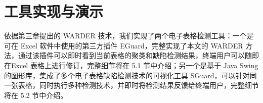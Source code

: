 \chapter{工具实现与演示}

依据第三章提出的 WARDER 技术，我们实现了两个电子表格检测工具：一个是可在 Excel 软件中使用的第三方插件 EGuard，完整实现了本文的 WARDER 方法，通过该插件可以即时看到当前表格的聚类和缺陷检测结果，终端用户可以随即在Excel 表格上进行修订，完整细节将在 5.1 节中介绍；另一个是基于 Java Swing 的图形库，集成了多个电子表格缺陷检测技术的可视化工具 SGuard，可以针对同一张表格，同时执行多种检测技术，并即时将检测结果反馈给终端用户，完整细节将在 5.2 节中介绍。




